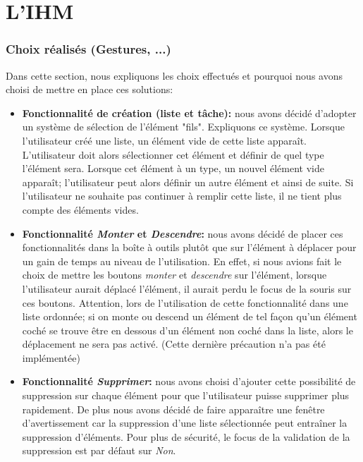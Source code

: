 \documentclass[a4paper,10pt]{article}
\begin{document}
\newpage
\section{L'IHM}

\subsubsection{Choix réalisés (Gestures, ...)}
Dans cette section, nous expliquons les choix effectués et pourquoi nous avons choisi de mettre en place ces solutions:

\begin{itemize}
\item \textbf{Fonctionnalité de création (liste et tâche):} nous avons décidé d'adopter un système de sélection de l'élément "fils". Expliquons
ce système. Lorsque l'utilisateur créé une liste, un élément vide de cette liste apparaît. L'utilisateur doit alors sélectionner cet élément et définir de quel type l'élément sera. Lorsque cet élément à un type, un nouvel élément vide apparaît; l'utilisateur peut alors définir un autre élément et ainsi de suite. Si l'utilisateur ne souhaite pas continuer à remplir cette liste, il ne tient plus compte des éléments vides.
\item \textbf{Fonctionnalité \textit{Monter} et \textit{Descendre}:} nous avons décidé de placer ces fonctionnalités dans la boîte à outils plutôt que sur l'élément à déplacer pour un gain de temps au niveau de l'utilisation. En effet, si nous avions fait le choix de mettre les boutons \textit{monter} et \textit{descendre} sur l'élément, lorsque l'utilisateur aurait déplacé l'élément, il aurait perdu le focus de la souris sur ces boutons.
Attention, lors de l'utilisation de cette fonctionnalité dans une liste ordonnée; si on monte ou descend un élément de tel façon qu'un élément coché se trouve être en dessous d'un élément non coché dans la liste, alors le déplacement ne sera pas activé. (Cette dernière précaution n'a pas été implémentée)
\item \textbf{Fonctionnalité \textit{Supprimer}:} nous avons choisi d'ajouter cette possibilité de suppression sur chaque élément pour que l'utilisateur puisse supprimer plus rapidement. De  plus nous avons décidé de faire apparaître une fenêtre d'avertissement car la suppression d'une liste sélectionnée peut entraîner la suppression d'éléments. Pour plus de sécurité, le focus de la validation de la suppression est par défaut sur \textit{Non}.

\end{itemize}
\end{document}
